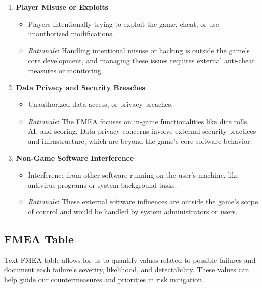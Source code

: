 \documentclass{article}
\begin{document}
\begin{enumerate}
    \item \textbf{Player Misuse or Exploits}
        \begin{itemize}
            \item Players intentionally trying to exploit the game, cheat, or use unauthorized modifications.
            \item \textit{Rationale}: Handling intentional misuse or hacking is outside the game's core development, and managing these issues requires external anti-cheat measures or monitoring.
        \end{itemize}

    \item \textbf{Data Privacy and Security Breaches}
        \begin{itemize}
            \item Unauthorized data access, or privacy breaches.
            \item \textit{Rationale}: The FMEA focuses on in-game functionalities like dice rolls, AI, and scoring. Data privacy concerns involve external security practices and infrastructure, which are beyond the game's core software behavior.
        \end{itemize}

    \item \textbf{Non-Game Software Interference}
        \begin{itemize}
            \item Interference from other software running on the user's machine, like antivirus programs or system background tasks.
            \item \textit{Rationale}: These external software influences are outside the game's scope of control and would be handled by system administrators or users.
        \end{itemize}

\end{enumerate}

\subsection{FMEA Table}

Text FMEA table allows for us to quantify values related to possible failures and document each failure's severity, likelihood, and detectability. These values can help guide our countermeasures and priorities in risk mitigation.
\end{document}
